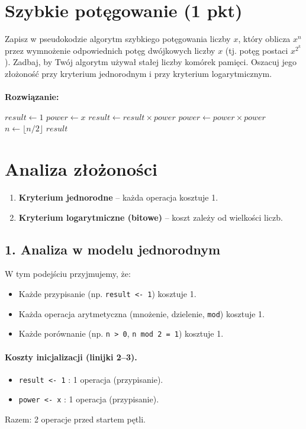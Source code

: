 \documentclass[12pt]{article}
\begin{document}
	\newpage
	\section{Szybkie potęgowanie (1 pkt)}
	Zapisz w pseudokodzie algorytm szybkiego potęgowania liczby $x$, który oblicza
	$x^{n}$ przez wymnożenie odpowiednich potęg dwójkowych liczby $x$ (tj. potęg postaci
	$x^{2^k}$). Zadbaj, by Twój algorytm używał stałej liczby komórek pamięci. Oszacuj
	jego złożoność przy kryterium jednorodnym i przy kryterium logarytmicznym. \\\\
	\textcolor{tokyoNightGreen}{\textbf{\large Rozwiązanie:}}
	\begin{algorithmic}
		[1]  \State $result \gets 1$ \State $power \gets
		x$   \State $result \gets result \times po
		wer$ \EndIf \State $power \gets power \times power$ \State $n \gets \lfloor n
		/2 \rfloor$ \EndWhile \State \Return $result$ \EndFunction
	\end{algorithmic}

    \section*{Analiza złożoności}
\begin{enumerate}
    \item \textbf{Kryterium jednorodne} -- każda operacja kosztuje 1.
    \item \textbf{Kryterium logarytmiczne (bitowe)} -- koszt zależy od wielkości liczb.
\end{enumerate}

\subsection*{1. Analiza w modelu jednorodnym}

W tym podejściu przyjmujemy, że:
\begin{itemize}
    \item Każde przypisanie (np. \texttt{result <- 1}) kosztuje 1.
    \item Każda operacja arytmetyczna (mnożenie, dzielenie, \texttt{mod}) kosztuje 1.
    \item Każde porównanie (np. \texttt{n > 0}, \texttt{n mod 2 = 1}) kosztuje 1.
\end{itemize}

\paragraph{Koszty inicjalizacji (linijki 2--3).}
\begin{itemize}
    \item \texttt{result <- 1} : 1 operacja (przypisanie).
    \item \texttt{power <- x} : 1 operacja (przypisanie).
\end{itemize}
Razem: 2 operacje przed startem pętli.
\end{document}
